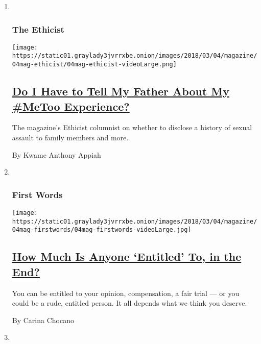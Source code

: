 \begin{enumerate}
\def\labelenumi{\arabic{enumi}.}
\item ~
  \hypertarget{the-ethicist}{%
  \subsubsection{The Ethicist}\label{the-ethicist}}

  \texttt{[image: https://static01.graylady3jvrrxbe.onion/images/2018/03/04/magazine/04mag-ethicist/04mag-ethicist-videoLarge.png]}

  \hypertarget{do-i-have-to-tell-my-father-about-my-metoo-experience}{%
  \subsection{\texorpdfstring{\href{/2018/02/27/magazine/do-i-have-to-tell-my-father-about-my-metoo-experience.html}{Do
  I Have to Tell My Father About My \#MeToo
  Experience?}}{Do I Have to Tell My Father About My \#MeToo Experience?}}\label{do-i-have-to-tell-my-father-about-my-metoo-experience}}

  The magazine's Ethicist columnist on whether to disclose a history of
  sexual assault to family members and more.

  By Kwame Anthony Appiah
\item ~
  \hypertarget{first-words}{%
  \subsubsection{First Words}\label{first-words}}

  \texttt{[image: https://static01.graylady3jvrrxbe.onion/images/2018/03/04/magazine/04mag-firstwords/04mag-firstwords-videoLarge.jpg]}

  \hypertarget{how-much-is-anyone-entitled-to-in-the-end}{%
  \subsection{\texorpdfstring{\href{/2018/02/27/magazine/how-much-is-anyone-entitled-to-in-the-end.html}{How
  Much Is Anyone `Entitled' To, in the
  End?}}{How Much Is Anyone `Entitled' To, in the End?}}\label{how-much-is-anyone-entitled-to-in-the-end}}

  You can be entitled to your opinion, compensation, a fair trial --- or
  you could be a rude, entitled person. It all depends what we think you
  deserve.

  By Carina Chocano
\item ~
  \hypertarget{diagnosis}{%
}
\end{enumerate}
